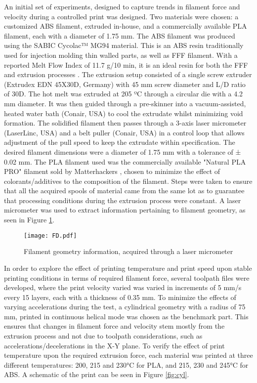 \documentclass[main.tex]{subfiles}
\begin{document}
An initial set of experiments, designed to capture trends in filament force and velocity during a controlled print was designed. Two materials were chosen: a customized ABS filament, extruded in-house, and a commercially available PLA filament, each with a diameter of 1.75 mm. The ABS filament was produced using the SABIC Cycolac™ MG94 material. This is an ABS resin traditionally used for injection molding thin walled parts, as well as FFF filament. With a reported Melt Flow Index of 11.7 g/10 min, it is an ideal resin for both the FFF and extrusion processes \cite{sabic2016}. The extrusion setup consisted of a single screw extruder (Extrudex EDN 45X30D, Germany) with 45 mm screw diameter and L/D ratio of 30D. The hot melt was extruded at 205 ºC through a circular die with a 4.2 mm diameter. It was then guided through a pre-skinner into a vacuum-assisted, heated water bath (Conair, USA) to cool the extrudate whilst minimizing void formation. The solidified filament then passes through a 3-axis laser micrometer (LaserLinc, USA) and a belt puller (Conair, USA) in a control loop that allows adjustment of the pull speed to keep the extrudate within specification. The desired filament dimensions were a diameter of 1.75 mm with a tolerance of ± 0.02 mm. The PLA filament used was the commercially available "Natural PLA PRO" filament sold by Matterhackers \cite{MH2020}, chosen to minimize the effect of colorants/additives to the composition of the filament. Steps were taken to ensure that all the acquired spools of material came from the same lot as to guarantee that processing conditions during the extrusion process were constant. A laser micrometer was used to extract information pertaining to filament geometry, as seen in Figure \ref{fig:FD}.

\begin{figure}[!htbp]
	\center
	\texttt{[image: FD.pdf]}
	\caption{Filament geometry information, acquired through a laser micrometer } \label{fig:FD}
\end{figure}

In order to explore the effect of printing temperature and print speed upon stable printing conditions in terms of required filament force, several toolpath files were developed, where the print velocity varied was varied in increments of 5 mm/s every 15 layers, each with a thickness of 0.35 mm. To minimize the effects of varying accelerations during the test, a cylindrical geometry with a radius of 75 mm, printed in continuous helical mode was chosen as the benchmark part. This ensures that changes in filament force and velocity stem mostly from the extrusion process and not due to toolpath considerations, such as accelerations/decelerations in the X-Y plane. To verify the effect of print temperature upon the required extrusion force, each material was printed at three different temperatures: 200, 215 and 230°C for PLA, and 215, 230 and 245°C for ABS. A schematic of the print can be seen in Figure \ref{fig:cyl}.
\end{document}
